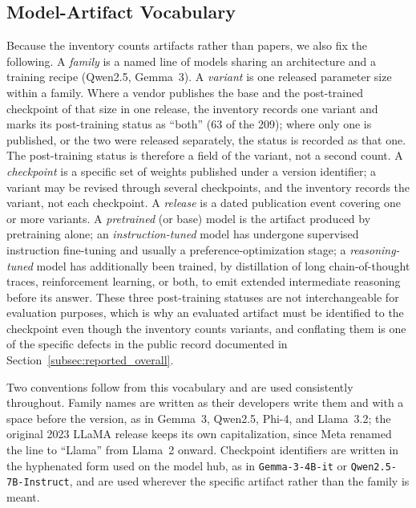 \subsection{Model-Artifact Vocabulary}
\label{subsubsec:intro_def_artifacts}

Because the inventory counts artifacts rather than papers, we also fix the
following. A \emph{family} is a named line of models sharing an architecture and
a training recipe (Qwen2.5, Gemma~3). A \emph{variant} is one released
parameter size within a family. Where a vendor publishes the base and the
post-trained checkpoint of that size in one release, the inventory records one
variant and marks its post-training status as ``both'' (63 of the 209); where
only one is published, or the two were released separately, the status is
recorded as that one. The post-training status is therefore a field of the
variant, not a second count. A \emph{checkpoint}
is a specific set of weights published under a version identifier; a variant may
be revised through several checkpoints, and the inventory records the variant,
not each checkpoint. A \emph{release} is a dated publication event covering one
or more variants. A \emph{pretrained} (or base) model is the artifact produced by
pretraining alone; an \emph{instruction-tuned} model has undergone supervised
instruction fine-tuning and usually a preference-optimization stage; a
\emph{reasoning-tuned} model has additionally been trained, by distillation of
long chain-of-thought traces, reinforcement learning, or both, to emit extended
intermediate reasoning before its answer. These three post-training statuses are
not interchangeable for evaluation purposes, which is why an evaluated artifact
must be identified to the checkpoint even though the inventory counts variants, and conflating them is one of the
specific defects in the public record documented in
Section~\ref{subsec:reported_overall}.

Two conventions follow from this vocabulary and are used consistently throughout.
Family names are written as their developers write them and with a space before
the version, as in Gemma~3, Qwen2.5, Phi-4, and Llama~3.2; the original 2023
LLaMA release keeps its own capitalization, since Meta renamed the line to
``Llama'' from Llama~2 onward. Checkpoint identifiers are written in the
hyphenated form used on the model hub, as in \texttt{Gemma-3-4B-it} or
\texttt{Qwen2.5-7B-Instruct}, and are used wherever the specific artifact rather
than the family is meant.

